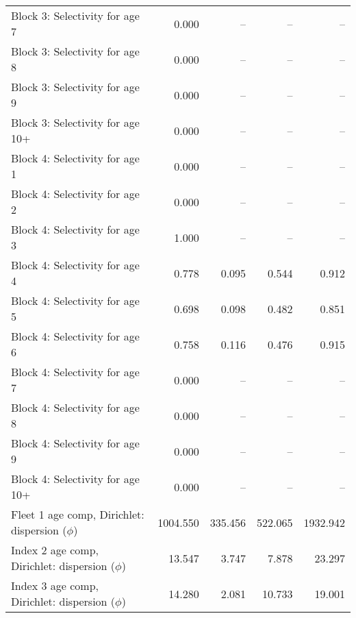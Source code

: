 \documentclass[
]{article}
\begin{document}
\begin{landscape}
\begin{longtable}[t]{lrrrr}
Block 3: Selectivity for age 7 & 0.000 & -- & -- & --\\
Block 3: Selectivity for age 8 & 0.000 & -- & -- & --\\
Block 3: Selectivity for age 9 & 0.000 & -- & -- & --\\
Block 3: Selectivity for age 10+ & 0.000 & -- & -- & --\\
\addlinespace
Block 4: Selectivity for age 1 & 0.000 & -- & -- & --\\
Block 4: Selectivity for age 2 & 0.000 & -- & -- & --\\
Block 4: Selectivity for age 3 & 1.000 & -- & -- & --\\
Block 4: Selectivity for age 4 & 0.778 & 0.095 & 0.544 & 0.912\\
Block 4: Selectivity for age 5 & 0.698 & 0.098 & 0.482 & 0.851\\
\addlinespace
Block 4: Selectivity for age 6 & 0.758 & 0.116 & 0.476 & 0.915\\
Block 4: Selectivity for age 7 & 0.000 & -- & -- & --\\
Block 4: Selectivity for age 8 & 0.000 & -- & -- & --\\
Block 4: Selectivity for age 9 & 0.000 & -- & -- & --\\
Block 4: Selectivity for age 10+ & 0.000 & -- & -- & --\\
\addlinespace
Fleet 1 age comp, Dirichlet: dispersion ($\phi$) & 1004.550 & 335.456 & 522.065 & 1932.942\\
Index 2 age comp, Dirichlet: dispersion ($\phi$) & 13.547 & 3.747 & 7.878 & 23.297\\
Index 3 age comp, Dirichlet: dispersion ($\phi$) & 14.280 & 2.081 & 10.733 & 19.001\\*
\end{longtable}
\end{landscape}
\end{document}
